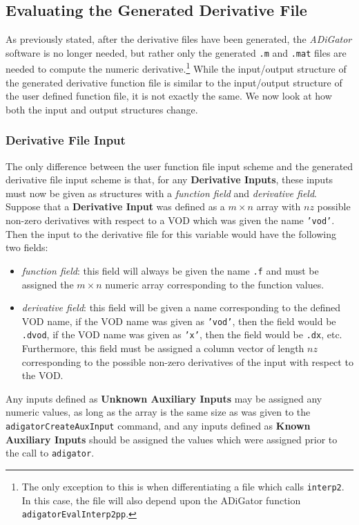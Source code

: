 \documentclass[10pt,pdftex]{article}
\begin{document}
\subsection{Evaluating the Generated Derivative File}
As previously stated, after the derivative files have been generated, the \emph{ADiGator} software is no longer needed, but rather only the generated \texttt{.m} and \texttt{.mat} files are needed to compute the numeric derivative.\footnote{The only exception to this is when differentiating a file which calls \texttt{interp2}. In this case, the file will also depend upon the ADiGator function \texttt{adigatorEvalInterp2pp}.} While the input/output structure of the generated derivative function file is similar to the input/output structure of the user defined function file, it is not exactly the same. We now look at how both the input and output structures change.
\subsubsection{Derivative File Input}
The only difference between the user function file input scheme and the generated derivative file input scheme is that, for any {\bf Derivative Inputs}, these inputs must now be given as structures with a \emph{function field} and \emph{derivative field}. Suppose that a {\bf Derivative Input} was defined as a $m \times n$ array with $nz$ possible non-zero derivatives with respect to a VOD which was given the name \texttt{'vod'}. Then the input to the derivative file for this variable would have the following two fields:
\begin{itemize}
\item \emph{function field}: this field will always be given the name \texttt{.f} and must be assigned the $m \times n$ numeric array corresponding to the function values.
\item \emph{derivative field}: this field will be given a name corresponding to the defined VOD name, if the VOD name was given as \texttt{'vod'}, then the field would be \texttt{.dvod}, if the VOD name was given as \texttt{'x'}, then the field would be \texttt{.dx}, etc.~ Furthermore, this field must be assigned a column vector of length $nz$ corresponding to the possible non-zero derivatives of the input with respect to the VOD.
\end{itemize}
Any inputs defined as {\bf Unknown Auxiliary Inputs} may be assigned any numeric values, as long as the array is the same size as was given to the \texttt{adigatorCreateAuxInput} command, and any inputs defined as {\bf Known Auxiliary Inputs} should be assigned the values which were assigned prior to the call to \texttt{adigator}.
\end{document}
